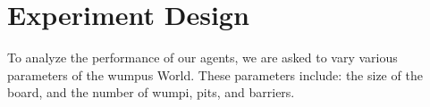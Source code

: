 \documentclass{article}
\begin{document}
	\section{Experiment Design}
	
	To analyze the performance of our agents, we are asked to vary various parameters of the wumpus World. These parameters include: the size of the board, and the number of wumpi, pits, and barriers. 
	
	
	

	




		
	
\end{document}
